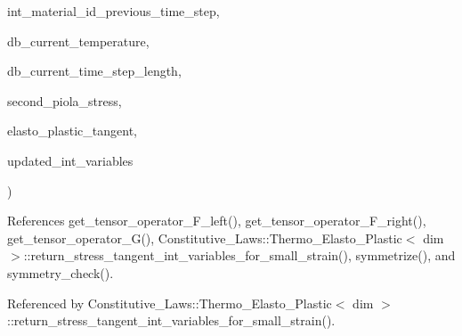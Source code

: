{\begin{DoxyParamCaption}
\item[{unsigned int}]{int\+\_\+material\+\_\+id\+\_\+previous\+\_\+time\+\_\+step, }
\item[{double}]{db\+\_\+current\+\_\+temperature, }
\item[{double}]{db\+\_\+current\+\_\+time\+\_\+step\+\_\+length, }
\item[{Symmetric\+Tensor$<$ 2, dim $>$ \&}]{second\+\_\+piola\+\_\+stress, }
\item[{Symmetric\+Tensor$<$ 4, dim $>$ \&}]{elasto\+\_\+plastic\+\_\+tangent, }
\item[{Q\+P\+H\+::internal\+\_\+variables\+\_\+incremental$<$ dim $>$ \&}]{updated\+\_\+int\+\_\+variables}
\end{DoxyParamCaption}
)\hspace{0.3cm}{\ttfamily [inline]}}\hypertarget{classConstitutive__Laws_1_1Thermo__Elasto__Plastic_a4edcd1aa7b22b47c8522c7bc5f2b211e}{}\label{classConstitutive__Laws_1_1Thermo__Elasto__Plastic_a4edcd1aa7b22b47c8522c7bc5f2b211e}


References get\+\_\+tensor\+\_\+operator\+\_\+\+F\+\_\+left(), get\+\_\+tensor\+\_\+operator\+\_\+\+F\+\_\+right(), get\+\_\+tensor\+\_\+operator\+\_\+\+G(), Constitutive\+\_\+\+Laws\+::\+Thermo\+\_\+\+Elasto\+\_\+\+Plastic$<$ dim $>$\+::return\+\_\+stress\+\_\+tangent\+\_\+int\+\_\+variables\+\_\+for\+\_\+small\+\_\+strain(), symmetrize(), and symmetry\+\_\+check().



Referenced by Constitutive\+\_\+\+Laws\+::\+Thermo\+\_\+\+Elasto\+\_\+\+Plastic$<$ dim $>$\+::return\+\_\+stress\+\_\+tangent\+\_\+int\+\_\+variables\+\_\+for\+\_\+small\+\_\+strain().


